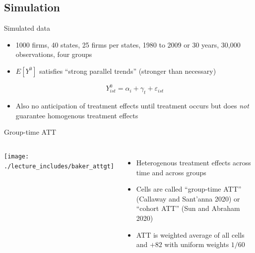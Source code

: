 \documentclass{beamer}
\begin{document}
\subsection{Simulation}

\begin{frame}{Simulated data}

\begin{itemize}
\item 1000 firms, 40 states, 25 firms per states, 1980 to 2009 or 30 years, 30,000 observations, four groups
\item $E[Y^0]$ satisfies ``strong parallel trends''  (stronger than necessary)

$$Y^0_{ist} = \alpha_i + \gamma_t + \varepsilon_{ist}$$

\item Also no anticipation of treatment effects until treatment occurs but does \emph{not} guarantee homogenous treatment effects
\end{itemize}
\end{frame}



\begin{frame}{Group-time ATT}
       \begin{columns}
             \centering
             \texttt{[image: ./lecture\_includes/baker\_attgt]}
		\begin{itemize}
\item Heterogenous treatment effects across time and across groups
\item Cells are called ``group-time ATT'' (Callaway and Sant'anna 2020) or ``cohort ATT'' (Sun and Abraham 2020)
\item ATT is weighted average of all cells and $+82$ with uniform weights $1/60$
		\end{itemize}
         \end{columns} 
    \end{frame}
\end{document}
